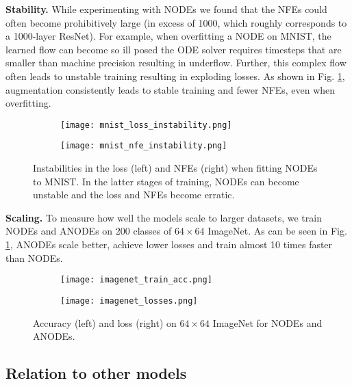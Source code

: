 \documentclass{article}
\begin{document}
\textbf{Stability.} While experimenting with NODEs we found that the NFEs could often become prohibitively large (in excess of 1000, which roughly corresponds to a 1000-layer ResNet). For example, when overfitting a NODE on MNIST, the learned flow can become so ill posed the ODE solver requires timesteps that are smaller than machine precision resulting in underflow. Further, this complex flow often leads to unstable training resulting in exploding losses. As shown in Fig. \ref{instability-fig}, augmentation consistently leads to stable training and fewer NFEs, even when overfitting.


\begin{figure}[b]
\centering
\begin{subfigure}[t]{0.36\linewidth}
\centering
\texttt{[image: mnist\_loss\_instability.png]}
\end{subfigure}
\begin{subfigure}[t]{0.36\linewidth}
\centering
\texttt{[image: mnist\_nfe\_instability.png]}
\end{subfigure}
\setlength{\abovecaptionskip}{-1pt}
\setlength{\belowcaptionskip}{-5pt}
\caption{Instabilities in the loss (left) and NFEs (right) when fitting NODEs to MNIST. In the latter stages of training, NODEs can become unstable and the loss and NFEs become erratic.}
\label{instability-fig}
\end{figure}

\textbf{Scaling.} To measure how well the models scale to larger datasets, we train NODEs and ANODEs on 200 classes of $64\times64$ ImageNet. As can be seen in Fig. \ref{instability-fig}, ANODEs scale better, achieve lower losses and train almost 10 times faster than NODEs.

\begin{figure}[t]
\centering
\begin{subfigure}[t]{0.34\linewidth}
\centering
\texttt{[image: imagenet\_train\_acc.png]}
\end{subfigure}
\begin{subfigure}[t]{0.34\linewidth}
\centering
\texttt{[image: imagenet\_losses.png]}
\end{subfigure}
\setlength{\abovecaptionskip}{-1pt}
\setlength{\belowcaptionskip}{-5pt}
\caption{Accuracy (left) and loss (right) on $64\times64$ ImageNet for NODEs and ANODEs.}
\label{imagenet-tests}
\end{figure}

\subsection{Relation to other models}
\end{document}
